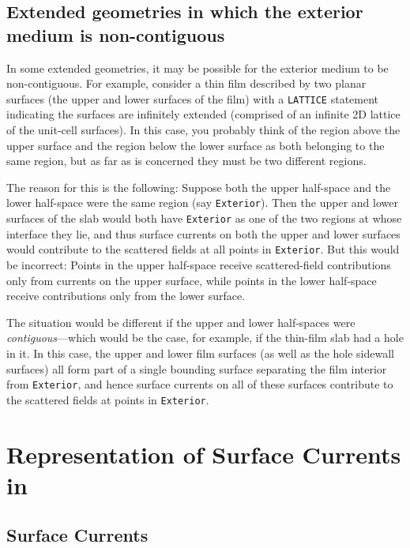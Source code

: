 \subsection*{Extended geometries in which the exterior medium
             is non-contiguous}

In some extended geometries, it may be possible for the 
exterior medium to be non-contiguous. For example,
consider a thin film described by two planar surfaces  
(the upper and lower surfaces of the film) with a
\texttt{LATTICE} statement indicating the surfaces
are infinitely extended (comprised of an infinite
2D lattice of the unit-cell surfaces).
In this case, you probably think of the region above the 
upper surface and the region below the lower surface as 
both belonging to the same region, but as far as 
\lss is concerned they must be two different regions.

The reason for this is the following: Suppose both
the upper half-space and the lower half-space were
the same region (say \texttt{Exterior}). Then the upper 
and lower surfaces of the slab would both have 
\texttt{Exterior} as one of the two regions 
at whose interface they lie, and thus surface currents
on both the upper and lower surfaces would contribute 
to the scattered fields at all points in \texttt{Exterior}.
But this would be incorrect: Points in the upper half-space
receive scattered-field contributions only from currents
on the upper surface, while points in the lower half-space 
receive contributions only from the lower surface. 

The situation would be different if the upper and lower 
half-spaces were \textit{contiguous}---which would be
the case, for example, if the thin-film slab had a hole
in it. In this case, the upper and lower film surfaces
(as well as the hole sidewall surfaces) all form 
part of a single bounding surface separating the 
film interior from \texttt{Exterior}, and hence surface
currents on all of these surfaces contribute to the
scattered fields at points in \texttt{Exterior}.

\newpage
\section{Representation of Surface Currents in \ls}

\subsection*{Surface Currents}

